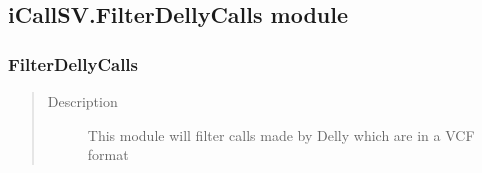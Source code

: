 \documentclass[letterpaper,10pt,english]{sphinxmanual}
\begin{document}
\subsection{iCallSV.FilterDellyCalls module}
\label{iCallSV:icallsv-filterdellycalls-module}\label{iCallSV:module-iCallSV.FilterDellyCalls}

\subsubsection{FilterDellyCalls}
\label{iCallSV:filterdellycalls}\begin{quote}\begin{description}
\item[{Description}] \leavevmode
This module will filter calls made by Delly which are in a VCF format

\end{description}\end{quote}
\end{document}
